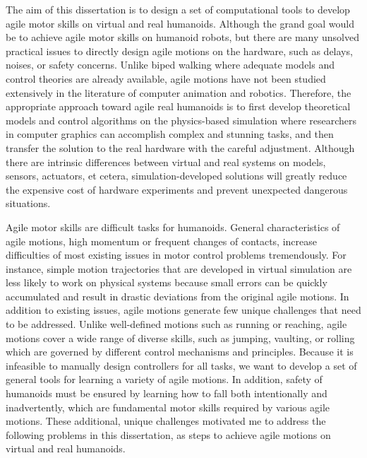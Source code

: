 The aim of this dissertation is to design a set of computational tools to
develop agile motor skills on virtual and real humanoids.
Although the grand goal would be to achieve agile motor skills on humanoid
robots, but there are many unsolved practical issues to directly design agile
motions on the hardware, such as delays, noises, or safety concerns.
Unlike biped walking where adequate models and control theories are
already available, agile motions have not been studied extensively in the
literature of computer animation and robotics.
Therefore, the appropriate approach toward agile real humanoids is to first
develop theoretical models and control algorithms on the physics-based
simulation where researchers in computer graphics can accomplish complex and
stunning tasks, and then transfer the solution to the real hardware
with the careful adjustment.
Although there are intrinsic differences between virtual and real systems on
models, sensors, actuators, et cetera, simulation-developed solutions will
greatly reduce the expensive cost of hardware experiments and prevent
unexpected dangerous situations.

Agile motor skills are difficult tasks for humanoids.
General characteristics of agile motions, high momentum or frequent changes
of contacts, increase difficulties of most existing issues in motor control
problems tremendously.
For instance, simple motion trajectories that are developed in virtual
simulation are less likely to work on physical systems
because small errors can be quickly accumulated and result in drastic deviations
from the original agile motions.
In addition to existing issues, agile motions generate few unique challenges
that need to be addressed.
Unlike well-defined motions such as running or reaching, agile motions cover
a wide range of diverse skills, such as jumping, vaulting, or rolling which are
governed by different control mechanisms and principles.
Because it is infeasible to manually design controllers for all tasks, we want
to develop a set of general tools for learning a variety of agile motions.
In addition, safety of humanoids must be ensured by learning how to fall
both intentionally and inadvertently, which are fundamental motor skills
required by various agile motions. 
These additional, unique challenges motivated me to address the following 
problems in this dissertation, as steps to achieve agile motions 
on virtual and real humanoids.


